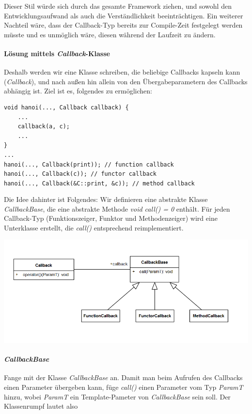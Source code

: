 \begin{enumerate}
Dieser Stil würde sich durch das gesamte Framework ziehen, und sowohl den Entwicklungsaufwand als auch die Verständlichkeit beeinträchtigen.
Ein weiterer Nachteil wäre, dass der Callback-Typ bereits zur Compile-Zeit festgelegt werden müsste und es unmöglich wäre, diesen während der Laufzeit zu ändern.

\paragraph*{Lösung mittels \emph{Callback}-Klasse}

Deshalb werden wir eine Klasse schreiben, die beliebige Callbacks kapseln kann (\emph{Callback}), und nach außen hin allein von den Übergabeparametern des Callbacks abhängig ist. Ziel ist es, folgendes zu ermöglichen:
\begin{lstlisting}
void hanoi(..., Callback callback) {
	...
	callback(a, c);
	...
}
...
hanoi(..., Callback(print)); // function callback
hanoi(..., Callback(c)); // functor callback
hanoi(..., Callback(&C::print, &c)); // method callback
\end{lstlisting}

Die Idee dahinter ist Folgendes:
Wir definieren eine abstrakte Klasse \emph{CallbackBase}, die eine abstrakte Methode \emph{void call() = 0} enthält.
Für jeden Callback-Typ (Funktionszeiger, Funktor und Methodenzeiger) wird eine Unterklasse erstellt, die \emph{call()} entsprechend reimplementiert.

\begin{center}
\includegraphics[width=.7\textwidth]{figures/callback_metamodel.png}
\end{center}

\paragraph*{\emph{CallbackBase}}

Fange mit der Klasse \emph{CallbackBase} an.
Damit man beim Aufrufen des Callbacks einen Parameter übergeben kann, füge \emph{call()} einen Parameter vom Typ \emph{ParamT} hinzu, wobei \emph{ParamT} ein Template-Pameter von \emph{CallbackBase} sein soll. Der Klassenrumpf lautet also


\end{enumerate}
